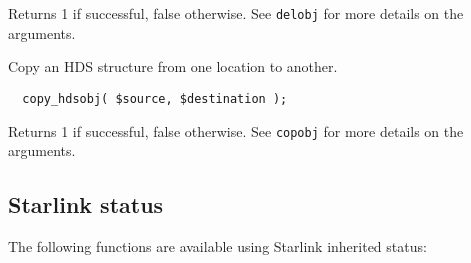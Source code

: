 \documentclass[twoside,11pt]{article}
\renewcommand{\_}{\texttt{\symbol{95}}}
\begin{document}
\begin{description}
Returns 1 if successful, false otherwise. See \texttt{delobj}
for more details on the arguments.


\item[\textbf{copy\_hdsobj}] \mbox{}

Copy an HDS structure from one location to another.

\begin{verbatim}
  copy_hdsobj( $source, $destination );
\end{verbatim}


Returns 1 if successful, false otherwise. See \texttt{copobj}
for more details on the arguments.

\end{description}
\subsection*{Starlink status\label{Starlink_status}}


The following functions are available using Starlink inherited status:
\end{document}
